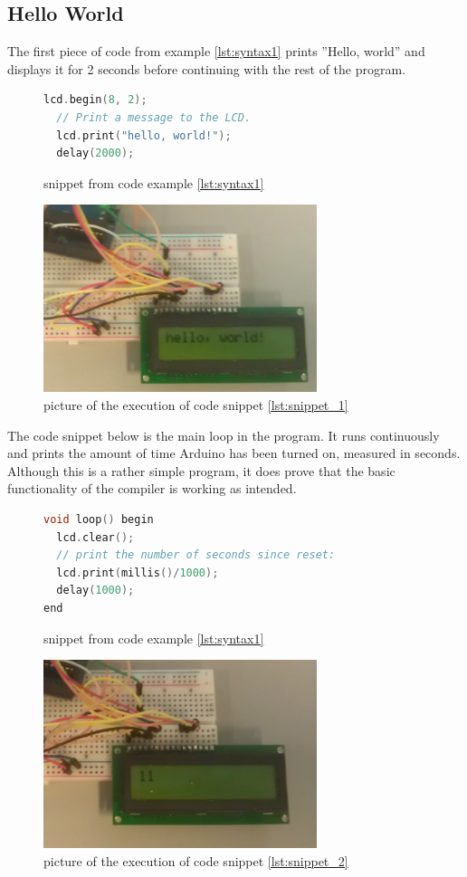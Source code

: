 \subsection*{Hello World}
The first piece of code from example \ref{lst:syntax1} prints ''Hello, world'' and displays it for 2 seconds before continuing with the rest of the program.
\begin{figure}[h]
\begin{lstlisting}[caption=Hello World ,firstnumber=11, language={C++}, label=lst:snippet_1]
  lcd.begin(8, 2);
  // Print a message to the LCD.
  lcd.print("hello, world!");
  delay(2000);
\end{lstlisting}
\caption{snippet from code example \ref{lst:syntax1}}
\end{figure}
\begin{figure}[h]
\centering
\includegraphics[width=8cm]{billeder/test_hello_1.jpg}
\caption{picture of the execution of code snippet \ref{lst:snippet_1}}
\end{figure}

The code snippet below is the main loop in the program. It runs continuously and prints the amount of time Arduino has been turned on, measured in seconds. Although this is a rather simple program, it does prove that the basic functionality of the compiler is working as intended.
\begin{figure}[h]
\begin{lstlisting}[caption=Hello World ,firstnumber=17, language={C++},label=lst:snippet_2]
void loop() begin
  lcd.clear();
  // print the number of seconds since reset:
  lcd.print(millis()/1000);
  delay(1000);
end
\end{lstlisting}
\caption{snippet from code example \ref{lst:syntax1}}
\end{figure}
\begin{figure}[htb]
\centering
\includegraphics[width=8cm]{billeder/test_hello_2.jpg}
\caption{picture of the execution of code snippet \ref{lst:snippet_2}}
\end{figure}


